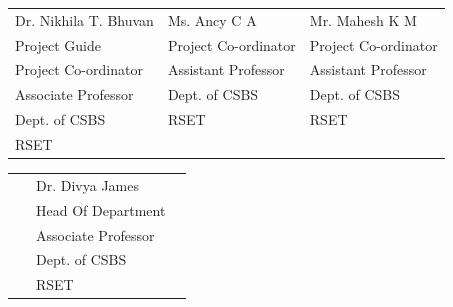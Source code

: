 \begin{flushleft}


	\begin{longtable}{p{5.8cm} p{5.8cm} p{5.8cm}}
		{Dr. Nikhila T. Bhuvan} & {Ms. Ancy C A}         & {Mr. Mahesh K M}       \\
		{Project Guide}        & {Project Co-ordinator} & {Project Co-ordinator} \\
		{Project Co-ordinator} & {Assistant Professor}  & {Assistant Professor}  \\
		{Associate Professor}  & {Dept. of CSBS}        & {Dept. of CSBS}        \\
		{Dept. of CSBS}        & {RSET}                 & {RSET}                 \\
		{RSET} ~               & {}                     & {}                     \\
	\end{longtable}
\end{flushleft}
\vspace{2cm}

\begin{flushleft}


	\begin{longtable}{p{5.8cm} p{5.8cm} p{5.8cm}}

		{}   & {Dr. Divya James}     & {} \\
		{}   & {Head Of Department}  & {} \\
		{}   & {Associate Professor} & {} \\
		{}   & {Dept. of CSBS}       & {} \\
		{} ~ & {RSET}                & {} \\
	\end{longtable}
\end{flushleft}


%	
%	
%		
